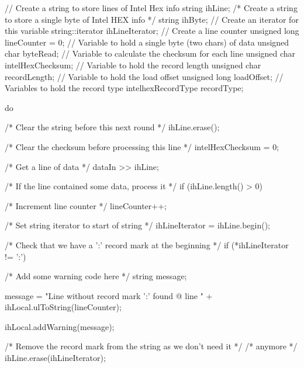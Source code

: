 \begin{DoxyCode}
{
    // Create a string to store lines of Intel Hex info
    string ihLine;
    /* Create a string to store a single byte of Intel HEX info               */
    string ihByte;
    // Create an iterator for this variable
    string::iterator ihLineIterator;
    // Create a line counter
    unsigned long lineCounter = 0;
    // Variable to hold a single byte (two chars) of data
    unsigned char byteRead;
    // Variable to calculate the checksum for each line
    unsigned char intelHexChecksum;
    // Variable to hold the record length
    unsigned char recordLength;
    // Variable to hold the load offset
    unsigned long loadOffset;
    // Variables to hold the record type
    intelhexRecordType recordType;
    
    do
    {
        /* Clear the string before this next round                            */
        ihLine.erase();
        
        /* Clear the checksum before processing this line                     */
        intelHexChecksum = 0;
        
        /* Get a line of data                                                 */
        dataIn >> ihLine;
        
        /* If the line contained some data, process it                        */
        if (ihLine.length() > 0)
        {
            /* Increment line counter                                         */
            lineCounter++;
        
            /* Set string iterator to start of string                         */
            ihLineIterator = ihLine.begin();
        
            /* Check that we have a ':' record mark at the beginning          */
            if (*ihLineIterator != ':')
            {
                /* Add some warning code here                                 */
                string message;

                message = "Line without record mark ':' found @ line " +
                                                ihLocal.ulToString(lineCounter);

                ihLocal.addWarning(message);
            }
        
            /* Remove the record mark from the string as we don't need it     */
            /* anymore                                                        */
            ihLine.erase(ihLineIterator);
        
}}}
\end{DoxyCode}
